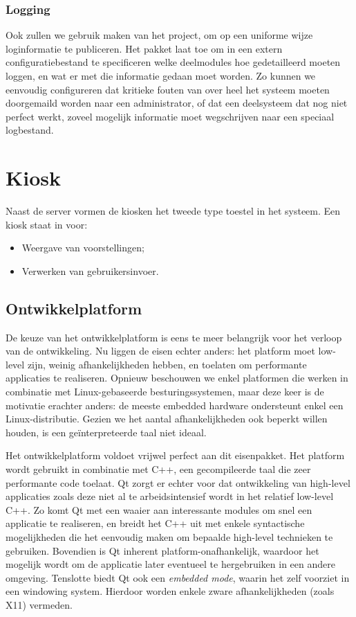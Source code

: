 \subsubsection{Logging}

Ook zullen we gebruik maken van het  project, om op een uniforme wijze loginformatie te publiceren. Het pakket laat toe om in een extern configuratiebestand te specificeren welke deelmodules hoe gedetailleerd moeten loggen, en wat er met die informatie gedaan moet worden. Zo kunnen we eenvoudig configureren dat kritieke fouten van over heel het systeem moeten doorgemaild worden naar een administrator, of dat een deelsysteem dat nog niet perfect werkt, zoveel mogelijk informatie moet wegschrijven naar een speciaal logbestand.

\section{Kiosk}
\label{ontwerp:applicatie:kiosk}

Naast de server vormen de kiosken het tweede type toestel in het systeem. Een kiosk staat in voor:
\begin{itemize}
\item Weergave van voorstellingen;
\item Verwerken van gebruikersinvoer.
\end{itemize}

\subsection{Ontwikkelplatform}

De keuze van het ontwikkelplatform is eens te meer belangrijk voor het verloop van de ontwikkeling. Nu liggen de eisen echter anders: het platform moet low-level zijn, weinig afhankelijkheden hebben, en toelaten om performante applicaties te realiseren. Opnieuw beschouwen we enkel platformen die werken in combinatie met Linux-gebaseerde besturingssystemen, maar deze keer is de motivatie erachter anders: de meeste embedded hardware ondersteunt enkel een Linux-distributie. Gezien we het aantal afhankelijkheden ook beperkt willen houden, is een geïnterpreteerde taal niet ideaal.

Het ontwikkelplatform  voldoet vrijwel perfect aan dit eisenpakket. Het platform wordt gebruikt in combinatie met C++, een gecompileerde taal die zeer performante code toelaat. Qt zorgt er echter voor dat ontwikkeling van high-level applicaties zoals deze niet al te arbeidsintensief wordt in het relatief low-level C++. Zo komt Qt met een waaier aan interessante modules om snel een applicatie te realiseren, en breidt het C++ uit met enkele syntactische mogelijkheden die het eenvoudig maken om bepaalde high-level technieken te gebruiken. Bovendien is Qt inherent platform-onafhankelijk, waardoor het mogelijk wordt om de applicatie later eventueel te hergebruiken in een andere omgeving. Tenslotte biedt Qt ook een \emph{embedded mode}, waarin het zelf voorziet in een windowing system. Hierdoor worden enkele zware afhankelijkheden (zoals X11) vermeden.

